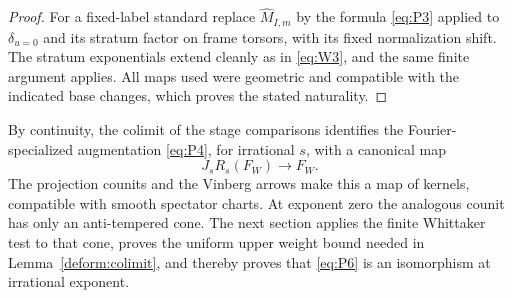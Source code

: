 \begin{proof}
For a fixed-label standard replace
$\widehat M_{I,m}$ by the formula
\eqref{eq:P3} applied to $\delta_{u=0}$ and its
stratum factor on frame torsors, with its fixed
normalization shift.  The stratum exponentials
extend cleanly as in \eqref{eq:W3}, and the same
finite argument applies.  All maps used were
geometric and compatible with the indicated
base changes, which proves the stated naturality.
\end{proof}

By continuity, the colimit of the stage comparisons
identifies the Fourier-specialized augmentation
\eqref{eq:P4}, for irrational $s$, with a canonical
map
\begin{equation}\label{eq:P6}
                         J_sR_s(F_W)\longrightarrow F_W.
\end{equation}
The projection counits and the Vinberg arrows make
this a map of kernels, compatible with smooth
spectator charts.  At exponent zero the analogous
counit has only an anti-tempered cone.  The next
section applies the finite Whittaker test to that
cone, proves the uniform upper weight bound needed
in Lemma~\ref{deform:colimit}, and thereby proves
that \eqref{eq:P6} is an isomorphism at irrational
exponent.

